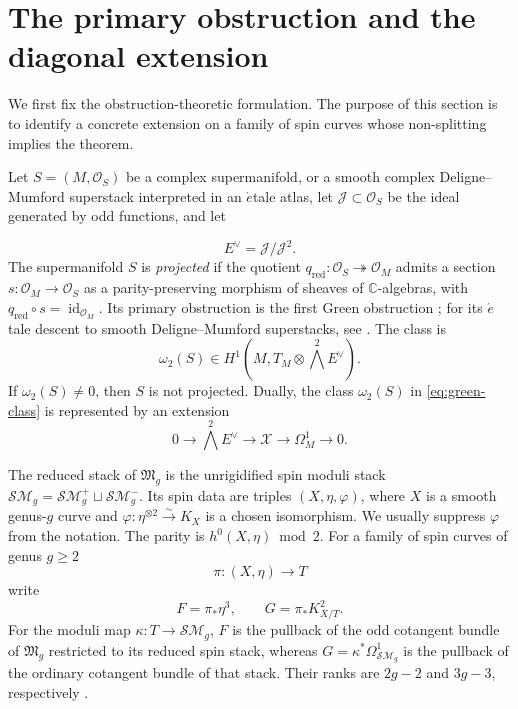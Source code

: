 \documentclass[11pt,a4paper,dvipsnames]{amsart}
\numberwithin{equation}{section}
\theoremstyle{plain}
\theoremstyle{definition}
\newcommand{\cO}{\mathcal O}
\newcommand{\cJ}{\mathcal J}
\newcommand{\M}{\mathfrak M}
\newcommand{\SM}{\mathcal S\mathcal M}
\newcommand{\id}{\operatorname{id}}
\newcommand{\CC}{\mathbb C}
\begin{document}
\section{The primary obstruction and the diagonal extension} \label{obstruction}

We first fix the obstruction-theoretic formulation.  The purpose of this
section is to identify a concrete extension on a family of spin curves whose
non-splitting implies the theorem.

Let $S=(M,\cO_S)$ be a complex supermanifold, or a smooth complex
Deligne--Mumford superstack interpreted in an $\acute{e}$tale atlas,
let $\cJ\subset\cO_S$ be the ideal generated by odd functions,
and let 

$$
 E^\vee=\cJ/\cJ^2.
$$
The supermanifold $S$ is \emph{projected} if the quotient
$q_{\mathrm{red}}:\cO_S\twoheadrightarrow\cO_M$ admits a section
$s:\cO_M\to\cO_S$ as a parity-preserving morphism of sheaves of
$\CC$-algebras, with
$q_{\mathrm{red}}\circ s=\id_{\cO_M}$.  Its primary obstruction is the first
Green obstruction \cite{Green}; for its $\acute{e}$tale descent to smooth
Deligne--Mumford superstacks, see
\cite[Proposition~2.2]{CorreaNojaCompactified}.  The class is
\begin{equation}\label{eq:green-class}
 \omega_2(S) \in H^1\!\left(M,T_M\otimes\bigwedge^2E^\vee\right).
\end{equation}
If $\omega_2(S)\neq0$, then $S$ is not projected.  Dually,
the class $\omega_2(S)$ in 
\eqref{eq:green-class} is represented by an extension
\begin{equation}\label{eq:abstract-extension}
 0\longrightarrow\bigwedge^2E^\vee
 \longrightarrow\mathscr X
 \longrightarrow\Omega_M^1
 \longrightarrow0.
\end{equation}

The reduced stack of $\M_g$ is the unrigidified spin moduli stack
$\SM_g=\SM_g^+\sqcup\SM_g^-$.  Its spin data are triples $(X,\eta,\varphi)$,
where $X$ is a smooth genus-$g$ curve and
$\varphi:\eta^{\otimes2}\xrightarrow{\sim}K_X$ is a chosen isomorphism.
We usually suppress
$\varphi$ from the notation.  The parity is $h^0(X,\eta)\bmod2$.  For a family of spin curves of genus $g\geq2$
$$
 \pi:(X,\eta)\longrightarrow T
$$
write
\begin{equation}\label{eq:F-G}
 F=\pi_*\eta^3,
 \qquad
 G=\pi_*K_{X/T}^2.
\end{equation}
For the moduli map $\kappa:T\to\SM_g$, $F$ is the pullback of the
odd cotangent bundle of $\M_g$ restricted to its reduced spin stack,
whereas $G=\kappa^*\Omega^1_{\SM_g}$ is the pullback of the ordinary
cotangent bundle of that stack.  Their ranks are $2g-2$ and $3g-3$, respectively
\cite[\S3.2 and Proposition~3.1]{DonagiWittenAtiyah}.
\end{document}
